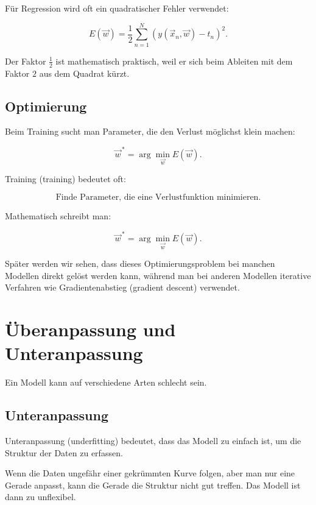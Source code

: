 Für Regression wird oft ein quadratischer Fehler verwendet:

\[
    E(\vec{w})
    =
    \frac{1}{2}
    \sum_{n=1}^{N}
    \left(
        y(\vec{x}_n,\vec{w}) - t_n
    \right)^2.
\]

Der Faktor \(\frac{1}{2}\) ist mathematisch praktisch, weil er sich beim Ableiten mit dem Faktor \(2\) aus dem Quadrat kürzt.

\subsection{Optimierung}

Beim Training sucht man Parameter, die den Verlust möglichst klein machen:

\[
    \vec{w}^{\,*}
    =
    \arg\min_{\vec{w}} E(\vec{w}).
\]

\begin{definitionbox}
Training (training) bedeutet oft:

\[
    \text{Finde Parameter, die eine Verlustfunktion minimieren.}
\]

Mathematisch schreibt man:

\[
    \vec{w}^{\,*}
    =
    \arg\min_{\vec{w}} E(\vec{w}).
\]
\end{definitionbox}

Später werden wir sehen, dass dieses Optimierungsproblem bei manchen Modellen direkt gelöst werden kann, während man bei anderen Modellen iterative Verfahren wie Gradientenabstieg (gradient descent) verwendet.

\section{Überanpassung und Unteranpassung}

Ein Modell kann auf verschiedene Arten schlecht sein.

\subsection{Unteranpassung}

Unteranpassung (underfitting) bedeutet, dass das Modell zu einfach ist, um die Struktur der Daten zu erfassen.

\begin{examplebox}
Wenn die Daten ungefähr einer gekrümmten Kurve folgen, aber man nur eine Gerade anpasst, kann die Gerade die Struktur nicht gut treffen.
Das Modell ist dann zu unflexibel.
\end{examplebox}

